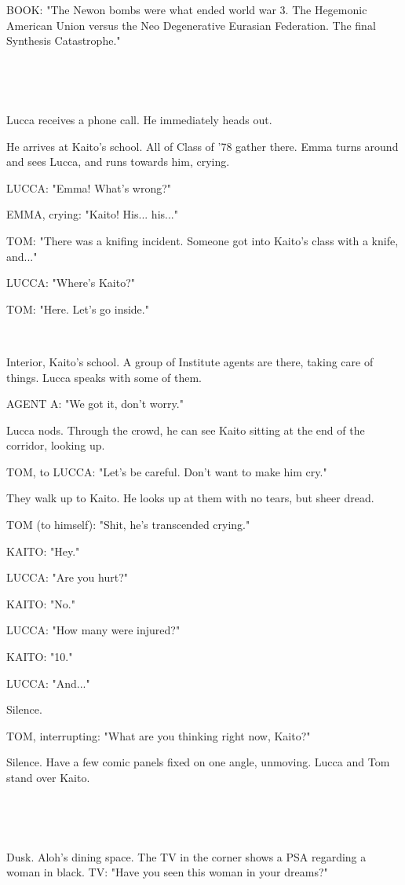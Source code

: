 \documentclass[11pt]{article}
\begin{document}
BOOK: "The Newon bombs were what ended world war 3.
The Hegemonic American Union versus the Neo Degenerative Eurasian Federation.
The final Synthesis Catastrophe."

\ 

\ 

Lucca receives a phone call.
He immediately heads out. 

He arrives at Kaito's school.
All of Class of '78 gather there.
Emma turns around and sees Lucca, and runs towards him, crying.

LUCCA: "Emma! What's wrong?"

EMMA, crying: "Kaito! His... his..." 

TOM: "There was a knifing incident.
Someone got into Kaito's class with a knife, and..."

LUCCA: "Where's Kaito?"

TOM: "Here. Let's go inside."

\ 

Interior, Kaito's school.
A group of Institute agents are there, taking care of things. 
Lucca speaks with some of them. 

AGENT A: "We got it, don't worry."

Lucca nods.
Through the crowd, he can see Kaito sitting at the end of the corridor, looking up.

TOM, to LUCCA: "Let's be careful.
Don't want to make him cry."

They walk up to Kaito.
He looks up at them with no tears, but sheer dread.

TOM (to himself): "Shit, he's transcended crying."

KAITO: "Hey."

LUCCA: "Are you hurt?"

KAITO: "No."

LUCCA: "How many were injured?"

KAITO: "10."

LUCCA: "And..."

Silence.

TOM, interrupting: "What are you thinking right now, Kaito?"

Silence.
Have a few comic panels fixed on one angle, unmoving.
Lucca and Tom stand over Kaito.

\ 

\ 

Dusk.
Aloh's dining space.
The TV in the corner shows a PSA regarding a woman in black.
TV: "Have you seen this woman in your dreams?"
\end{document}
